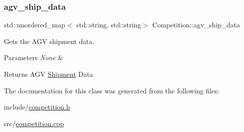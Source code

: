 \subsubsection{\texorpdfstring{agv\+\_\+ship\+\_\+data}{agv\_ship\_data}}
{\footnotesize\ttfamily std\+::unordered\+\_\+map$<$ std\+::string, std\+::string$>$ Competition\+::agv\+\_\+ship\+\_\+data}



Gets the A\+GV shipment data. 


\begin{DoxyParams}{Parameters}
{\em None} & \\
\hline
\end{DoxyParams}
\begin{DoxyReturn}{Returns}
A\+GV \hyperlink{structShipment}{Shipment} Data 
\end{DoxyReturn}


The documentation for this class was generated from the following files\+:\begin{DoxyCompactItemize}
\item 
include/\hyperlink{competition_8h}{competition.\+h}\item 
src/\hyperlink{competition_8cpp}{competition.\+cpp}\end{DoxyCompactItemize}
